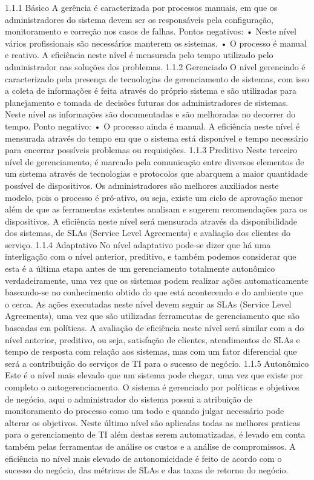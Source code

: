 \documentclass[11pt,twoside]{article}
\begin{document}
1.1.1	Básico
A gerência é caracterizada por processos manuais, em que os administradores do sistema devem ser os responsáveis pela configuração, monitoramento e correção nos casos de falhas. 
Pontos negativos: 
•	Neste nível vários profissionais são necessários manterem os sistemas.
•	O processo é manual e reativo.
A eficiência neste nível é mensurada pelo tempo utilizado pelo administrador nas soluções dos problemas.
1.1.2	Gerenciado
O nível gerenciado é caracterizado pela presença de tecnologias de gerenciamento de sistemas, com isso a coleta de informações é feita através do próprio sistema e são utilizadas para planejamento e tomada de decisões futuras dos administradores de sistemas. Neste nível as informações são documentadas e são melhoradas no decorrer do tempo.
Ponto negativo:
•	O processo ainda é manual.
A eficiência neste nível é mensurada através do tempo em que o sistema está disponível e tempo necessário para encerrar possíveis problemas ou requisições.
1.1.3	Preditivo
Neste terceiro nível de gerenciamento, é marcado pela comunicação entre diversos elementos de um sistema através de tecnologias e protocolos que abarquem a maior quantidade possível de dispositivos. Os administradores são melhores auxiliados neste modelo, pois o processo é pró-ativo, ou seja, existe um ciclo de aprovação menor além de que as ferramentas existentes analisam e sugerem recomendações para os dispositivos.
A eficiência neste nível será mensurada através da disponibilidade dos sistemas, de SLAs (Service Level Agreements) e avaliação dos clientes do serviço.
1.1.4	Adaptativo
No nível adaptativo pode-se dizer que há uma interligação com o nível anterior, preditivo, e também podemos considerar que esta é a última etapa antes de um gerenciamento totalmente autonômico verdadeiramente, uma vez que os sistemas podem realizar ações automaticamente baseando-se no conhecimento obtido do que está acontecendo e do ambiente que o cerca. As ações executadas neste nível devem seguir as SLAs (Service Level Agreements), uma vez que são utilizadas ferramentas de gerenciamento que são baseadas em políticas.
A avaliação de eficiência neste nível será similar com a do nível anterior, preditivo, ou seja, satisfação de clientes, atendimentos de SLAs e tempo de resposta com relação aos sistemas, mas com um fator diferencial que será a contribuição do serviços de TI para o sucesso de negócio.
1.1.5	Autonômico
Este é o nível mais elevado que um sistema pode chegar, uma vez que existe por completo o autogerenciamento. O sistema é gerenciado por políticas e objetivos de negócio, aqui o administrador do sistema possui a atribuição de monitoramento do processo como um todo e quando julgar necessário pode alterar os objetivos. Neste último nível são aplicadas todas as melhores praticas para o gerenciamento de TI além destas serem automatizadas, é levado em conta também pelas ferramentas de análise os custos e a análise de compromissos.
A eficiência no nível mais elevado de autonomicidade é feito de acordo com o sucesso do negócio, das métricas de SLAs e das taxas de retorno do negócio.
\end{document}

